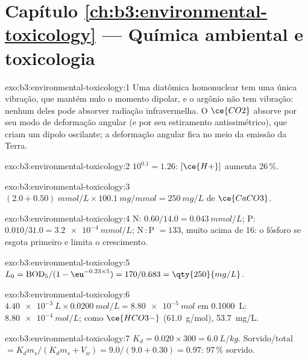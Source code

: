 \section*{Capítulo \ref{ch:b3:environmental-toxicology} --- Química ambiental e toxicologia}

\begin{solution}{exo:b3:environmental-toxicology:1}
Uma diatômica homonuclear tem uma única vibração, que mantém nulo o momento dipolar,
e o argônio não tem vibração: nenhum deles pode absorver radiação infravermelha. O $\ce{CO2}$ absorve por
seu modo de deformação angular (e por seu estiramento antissimétrico), que criam um dipolo
oscilante; a deformação angular fica no meio da emissão da Terra.
\end{solution}

\begin{solution}{exo:b3:environmental-toxicology:2}
$10^{0.1} = 1.26$: $[\ce{H+}]$ aumenta 26\,\%.
\end{solution}

\begin{solution}{exo:b3:environmental-toxicology:3}
$(2.0 + 0.50)\ \unit{mmol/L} \times \qty{100.1}{mg/mmol} = \qty{250}{mg/L}$ de $\ce{CaCO3}$.
\end{solution}

\begin{solution}{exo:b3:environmental-toxicology:4}
N: $0.60/14.0 = \qty{0.043}{mmol/L}$; P: $0.010/31.0 = \qty{3.2e-4}{mmol/L}$; N\,:\,P $= 133$, muito acima de 16: o fósforo se esgota
primeiro e limita o crescimento.
\end{solution}

\begin{solution}{exo:b3:environmental-toxicology:5}
$L_0 = \mathrm{BOD_5}/(1 - \eu^{-0.23 \times 5}) = 170/0.683 = \qty{250}{mg/L}$.
\end{solution}

\begin{solution}{exo:b3:environmental-toxicology:6}
$\qty{4.40e-3}{L} \times \qty{0.0200}{mol/L} = \qty{8.80e-5}{mol}$ em \qty{0.1000}{L}:  $\qty{8.80e-4}{mol/L}$; como $\ce{HCO3-}$ (\qty{61.0}{g/mol}),
\qty{53.7}{mg/L}.
\end{solution}

\begin{solution}{exo:b3:environmental-toxicology:7}
$K_d = 0.020 \times 300 = \qty{6.0}{L/kg}$. Sorvido/total $= K_dm_s/(K_dm_s + V_w) = 9.0/(9.0 + 0.30) = 0.97$: 97\,\% sorvido.
\end{solution}

